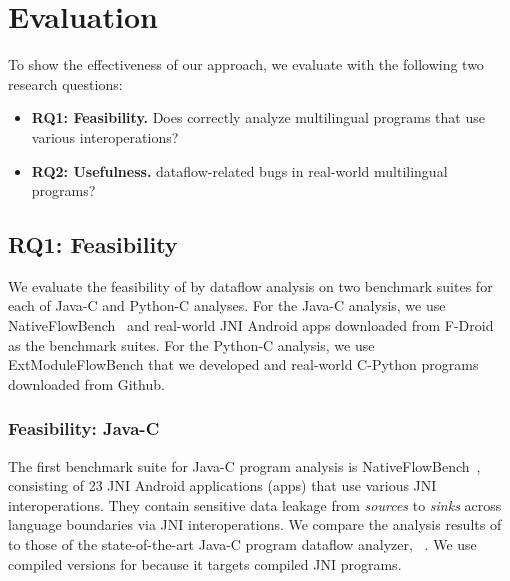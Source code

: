 \newcommand{\req}[1]{RQ#1}

\section{Evaluation}\label{sec:eval}



To show the effectiveness of our approach, we evaluate
\ours with the following two research questions:
\begin{itemize}
  \item \textbf{\req{1}: Feasibility.} Does \ours correctly analyze multilingual
    programs that use various interoperations?

  \item \textbf{\req{2}: Usefulness.}  dataflow-related
    bugs in real-world multilingual programs?
\end{itemize}

\subsection{\req{1}: Feasibility}
We evaluate the feasibility of \ours by dataflow analysis on
two benchmark suites for each of Java-C and Python-C analyses.
For the Java-C analysis, we use NativeFlowBench~\cite{nativeflowbench, JN-SAF}
and real-world JNI Android apps downloaded from F-Droid~\cite{fdroid} as the
benchmark suites.
For the Python-C analysis, we use ExtModuleFlowBench that we developed and
real-world C-Python programs downloaded from Github. 

\subsubsection{Feasibility: Java-C}
The first benchmark suite for Java-C program analysis is NativeFlowBench~\cite{nativeflowbench, JN-SAF},
consisting of 23 JNI Android applications (apps) that use various JNI interoperations.
They contain sensitive data leakage from {\it sources} to {\it sinks}
across language boundaries via JNI interoperations.
We compare the analysis results of \ours to those of the state-of-the-art Java-C program
dataflow analyzer, \jnsaf~\cite{JN-SAF}. We use
compiled versions for \jnsaf because it targets compiled JNI programs.

